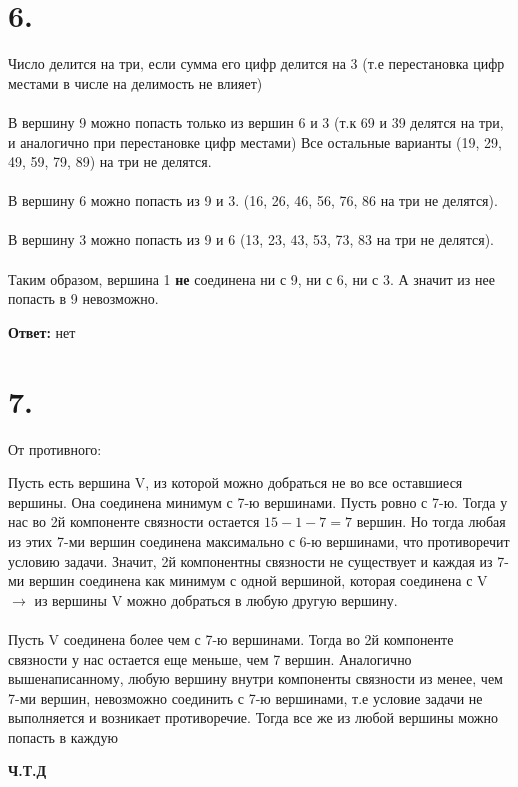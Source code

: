 \documentclass[a4paper,12pt]{article}
\begin{document}
\section*{6.}
Число делится на три, если сумма его цифр делится на 3 (т.е перестановка цифр местами в числе на делимость не влияет) 
\\\\
В вершину 9 можно попасть только из вершин 6 и 3 (т.к 69 и 39 делятся на три, и аналогично при перестановке цифр местами) Все остальные варианты (19, 29, 49, 59, 79, 89) на три не делятся. 
\\\\
В вершину 6 можно попасть из 9 и 3. (16, 26, 46, 56, 76, 86 на три не делятся). 
\\\\
В вершину 3 можно попасть из 9 и 6 (13, 23, 43, 53, 73, 83 на три не делятся).
\\\\
Таким образом, вершина 1 \textbf{не} соединена ни с 9, ни с 6, ни с 3. А значит из нее попасть в 9 невозможно.
\begin{center}
\textbf{Ответ:} нет
\end{center}
\section*{7.}
От противного:

Пусть есть вершина V, из которой можно добраться не во все оставшиеся вершины. Она соединена минимум с 7-ю вершинами. Пусть ровно с 7-ю. Тогда у нас во 2й компоненте связности остается $15-1-7 = 7$ вершин. Но тогда любая из этих 7-ми вершин соединена максимально с 6-ю вершинами, что противоречит условию задачи. Значит, 2й компонентны связности не существует и каждая из 7-ми вершин соединена как минимум с одной вершиной, которая соединена с V $\rightarrow$ из вершины V можно добраться в любую другую вершину.
\\\\
Пусть V соединена более чем с  7-ю вершинами. Тогда во 2й компоненте связности у нас остается еще меньше, чем 7 вершин. Аналогично вышенаписанному, любую вершину внутри компоненты связности из менее, чем 7-ми вершин, невозможно соединить с 7-ю вершинами, т.е условие задачи не выполняется и возникает противоречие. Тогда все же из любой вершины можно попасть в каждую
\begin{center}
\textbf{Ч.Т.Д}
\end{center}
\end{document}
